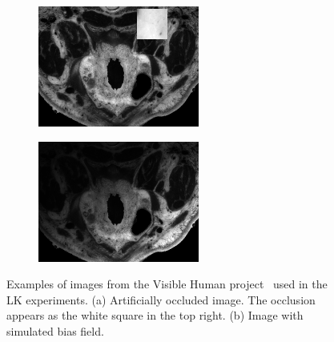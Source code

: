 \begin{figure}[h]
    \centering
    \begin{subfigure}{0.47\columnwidth}
        \includegraphics[width=\textwidth]{statistical_normals/lk/3d/images/occluded-example}
        \caption{}\label{fig:lk_occluded_example}
    \end{subfigure}
    \begin{subfigure}{0.47\columnwidth}
        \includegraphics[width=\textwidth]{statistical_normals/lk/3d/images/biasfield-example}
        \caption{}\label{fig:lk_biasfield_example}
    \end{subfigure}
    \caption{Examples of images from the Visible Human project~\cite{RefWorks:81} 
             used in the LK experiments. (a) Artificially occluded image. The
             occlusion appears as the white square in the top right. (b) Image
             with simulated bias field.}
\label{fig:lk_affine_examples}
\end{figure}
